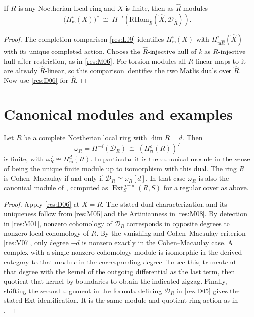 \begin{corollary}\label{res:D07}
If $R$ is any Noetherian local ring and $X$ is finite, then as
$\widehat R$-modules
\[
 \bigl(H^i_{\mathfrak m}(X)\bigr)^\vee
 \ \cong\
 H^{-i}\!\left(\mathrm{RHom}_{\widehat R}
        (\widehat X,\mathcal D_{\widehat R})\right).
\]
\end{corollary}
\begin{proof}
The completion comparison \ref{res:L09} identifies
$H^i_{\mathfrak m}(X)$ with
$H^i_{\mathfrak m\widehat R}(\widehat X)$ with its unique
completed action. Choose the $\widehat R$-injective hull of
$k$ as $R$-injective hull after restriction, as in \ref{res:M06}.
For torsion modules all $R$-linear maps to it are already
$\widehat R$-linear, so this comparison identifies the two
Matlis duals over $\widehat R$. Now use \ref{res:D06} for
$\widehat R$.
\end{proof}

\section{Canonical modules and examples}

\begin{proposition}\label{res:D08}
Let $R$ be a complete Noetherian local ring with $\dim R=d$. Then
\[
      \omega_R=H^{-d}(\mathcal D_R)
             \ \cong\ (H^d_{\mathfrak m}(R))^\vee
\]
is finite, with $\omega_R^\vee\cong H^d_{\mathfrak m}(R)$. In
particular it is the canonical module in the sense of being the
unique finite module up to isomorphism with this dual. The ring
$R$ is Cohen--Macaulay if and only if
$\mathcal D_R\simeq\omega_R[d]$. In that case $\omega_R$ is also
the canonical module of \cite[GC-10]{core}, computed as
$\operatorname{Ext}^{n-d}_S(R,S)$ for a regular cover as above.
\end{proposition}
\begin{proof}
Apply \ref{res:D06} at $X=R$. The stated dual characterization
and its uniqueness follow from \ref{res:M05} and the Artinianness
in \ref{res:M08}. By detection in \ref{res:M01}, nonzero
cohomology of $\mathcal D_R$ corresponds in opposite degrees to
nonzero local cohomology of $R$. By the vanishing and
Cohen--Macaulay criterion \ref{res:V07}, only degree $-d$ is
nonzero exactly in the Cohen--Macaulay case. A complex with a
single nonzero cohomology module is isomorphic in the derived
category to that module in the corresponding degree. To see this,
truncate at that degree with the kernel of the outgoing
differential as the last term, then quotient that kernel by
boundaries to obtain the indicated zigzag. Finally, shifting
the second argument in the formula defining $\mathcal D_R$ in
\ref{res:D05} gives the stated Ext identification. It is the
same module and quotient-ring action as in \cite[GC-10]{core}.
\end{proof}

